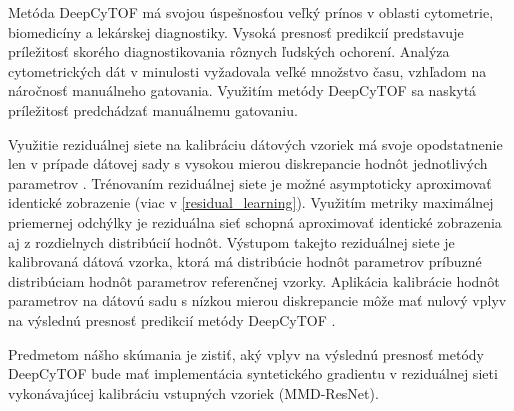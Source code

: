Metóda DeepCyTOF má svojou úspešnosťou veľký prínos v oblasti cytometrie, biomedicíny a lekárskej diagnostiky. Vysoká presnosť predikcií predstavuje príležitosť skorého diagnostikovania rôznych ľudských ochorení. Analýza cytometrických dát v minulosti vyžadovala veľké množstvo času, vzhľadom na náročnosť manuálneho gatovania. Využitím metódy DeepCyTOF sa naskytá príležitosť predchádzať manuálnemu gatovaniu.

Využitie reziduálnej siete na kalibráciu dátových vzoriek má svoje opodstatnenie len v prípade dátovej sady s vysokou mierou diskrepancie hodnôt jednotlivých parametrov \cite{Li2017}. Trénovaním reziduálnej siete je možné asymptoticky aproximovať identické zobrazenie (viac v \ref{residual_learning}). Využitím metriky maximálnej priemernej odchýlky je reziduálna sieť schopná aproximovať identické zobrazenia aj z rozdielnych distribúcií hodnôt. Výstupom takejto reziduálnej siete je kalibrovaná dátová vzorka, ktorá má distribúcie hodnôt parametrov príbuzné distribúciam hodnôt parametrov referenčnej vzorky. Aplikácia kalibrácie hodnôt parametrov na dátovú sadu s nízkou mierou diskrepancie môže mať nulový vplyv na výslednú presnosť predikcií metódy DeepCyTOF \cite{Li2017}.

Predmetom nášho skúmania je zistiť, aký vplyv na výslednú presnosť metódy DeepCyTOF bude mať implementácia syntetického gradientu v reziduálnej sieti vykonávajúcej kalibráciu vstupných vzoriek (MMD-ResNet).
